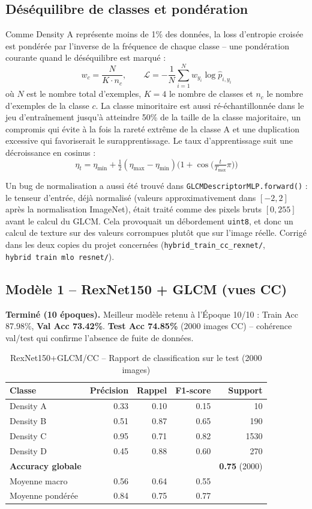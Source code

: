 \documentclass[12pt,a4paper]{report}
\begin{document}
\subsection{Déséquilibre de classes et pondération}
Comme Density A représente moins de 1\% des données, la loss d'entropie
croisée est pondérée par l'inverse de la fréquence de chaque classe -- une
pondération courante quand le déséquilibre est marqué :
\[
  w_c = \frac{N}{K \cdot n_c}, \qquad
  \mathcal{L} = -\frac{1}{N}\sum_{i=1}^N w_{y_i} \log \hat{p}_{i,y_i}
\]
où $N$ est le nombre total d'exemples, $K{=}4$ le nombre de classes et $n_c$
le nombre d'exemples de la classe $c$. La classe minoritaire est aussi
ré-échantillonnée dans le jeu d'entraînement jusqu'à atteindre 50\% de la
taille de la classe majoritaire, un compromis qui évite à la fois la rareté
extrême de la classe A et une duplication excessive qui favoriserait le
surapprentissage. Le taux d'apprentissage suit une décroissance en cosinus :
\[
  \eta_t = \eta_{\min} + \tfrac{1}{2}(\eta_{\max}-\eta_{\min})
  \Big(1+\cos\big(\tfrac{t}{T_{\max}}\pi\big)\Big)
\]

Un bug de normalisation a aussi été trouvé dans
\texttt{GLCMDescriptorMLP.forward()} : le tenseur d'entrée, déjà normalisé
(valeurs approximativement dans $[-2, 2]$ après la normalisation ImageNet),
était traité comme des pixels bruts $[0, 255]$ avant le calcul du GLCM.
Cela provoquait un débordement \texttt{uint8}, et donc un calcul de texture
sur des valeurs corrompues plutôt que sur l'image réelle. Corrigé dans les
deux copies du projet concernées (\texttt{hybrid\_train\_cc\_rexnet/},
\texttt{hybrid~train~mlo~resnet/}).

\subsection{Modèle 1 -- RexNet150 + GLCM (vues CC)}
\textbf{Terminé (10 époques).} Meilleur modèle retenu à l'Époque 10/10 :
Train Acc 87.98\%, \textbf{Val Acc 73.42\%}. \textbf{Test Acc 74.85\%}
(2000 images CC) -- cohérence val/test qui confirme l'absence de fuite de
données.

\begin{table}[h]
\centering
\caption{RexNet150+GLCM/CC -- Rapport de classification sur le test (2000 images)}
\begin{tabular}{lrrrr}
\toprule
Classe & Précision & Rappel & F1-score & Support \\
\midrule
Density A & 0.33 & 0.10 & 0.15 & 10 \\
Density B & 0.51 & 0.87 & 0.65 & 190 \\
Density C & 0.95 & 0.71 & 0.82 & 1530 \\
Density D & 0.45 & 0.88 & 0.60 & 270 \\
\midrule
\textbf{Accuracy globale} & \multicolumn{3}{c}{} & \textbf{0.75} (2000) \\
Moyenne macro & 0.56 & 0.64 & 0.55 & \\
Moyenne pondérée & 0.84 & 0.75 & 0.77 & \\
\bottomrule
\end{tabular}
\end{table}
\end{document}
